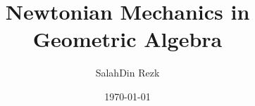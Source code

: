 \documentclass[working]{article}
\title{Newtonian Mechanics in Geometric Algebra}
\author{SalahDin Rezk}
\date{\today}
\begin{document}
\createintro



% 
% 

\listnotes
\end{document}

